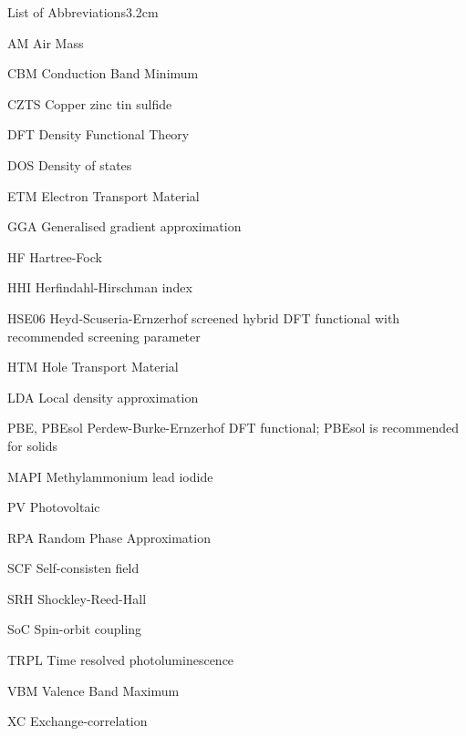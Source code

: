 \begin{mclistof}{List of Abbreviations}{3.2cm}

\item[AM] Air Mass
\item[CBM] Conduction Band Minimum
\item[CZTS] Copper zinc tin sulfide
\item[DFT] Density Functional Theory
\item[DOS] Density of states
\item[ETM] Electron Transport Material
\item[GGA] Generalised gradient approximation
\item[HF] Hartree-Fock
\item[HHI] Herfindahl-Hirschman index
\item[HSE06] Heyd-Scuseria-Ernzerhof screened hybrid DFT functional with recommended screening parameter
\item[HTM] Hole Transport Material
\item[LDA] Local density approximation
\item[PBE, PBEsol] Perdew-Burke-Ernzerhof DFT functional; PBEsol is recommended for solids
\item[MAPI] Methylammonium lead iodide
\item[PV] Photovoltaic
\item[RPA] Random Phase Approximation
\item[SCF] Self-consisten field
\item[SRH] Shockley-Reed-Hall 
\item[SoC] Spin-orbit coupling
\item[TRPL] Time resolved photoluminescence
\item[VBM] Valence Band Maximum
\item[XC] Exchange-correlation

\end{mclistof} 
